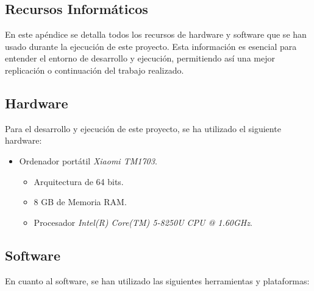 \begin{appendices}

\chapter{Recursos Informáticos} \label{chap:recursos}

En este apéndice se detalla todos los recursos de hardware y software que se han usado durante la ejecución de este proyecto. Esta información es esencial para entender el entorno de desarrollo y ejecución, permitiendo así una mejor replicación o continuación del trabajo realizado.
    
\section{Hardware}

Para el desarrollo y ejecución de este proyecto, se ha utilizado el siguiente hardware:

\begin{itemize}
    \item Ordenador portátil \textit{Xiaomi TM1703}.
    \begin{itemize}
    \item Arquitectura de 64 bits.
    \item 8 GB de Memoria RAM.
    \item Procesador \textit{ Intel(R) Core(TM) 5-8250U CPU @ 1.60GHz}.
    \end{itemize}
\end{itemize}

\section{Software}

En cuanto al software, se han utilizado las siguientes herramientas y plataformas:


\end{appendices}
